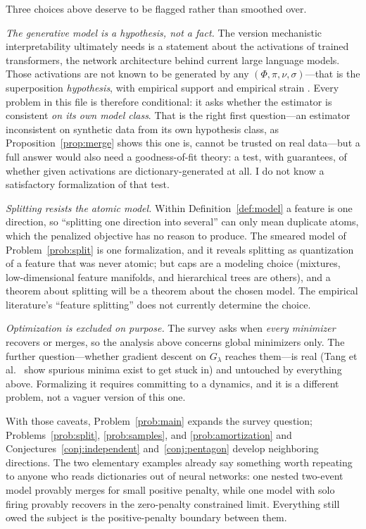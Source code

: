 \documentclass[11pt]{amsart}
\theoremstyle{plain}
\theoremstyle{definition}
\begin{document}
Three choices above deserve to be flagged rather than smoothed over.

\emph{The generative model is a hypothesis, not a fact.} The version mechanistic interpretability ultimately needs is a statement about the activations of trained transformers, the network architecture behind current large language models. Those activations are not known to be generated by any $(\Phi,\pi,\nu,\sigma)$---that is the superposition \emph{hypothesis}, with empirical support \cite{elhage2022,bricken2023} and empirical strain \cite{leask2025}. Every problem in this file is therefore conditional: it asks whether the estimator is consistent \emph{on its own model class}. That is the right first question---an estimator inconsistent on synthetic data from its own hypothesis class, as Proposition~\ref{prop:merge} shows this one is, cannot be trusted on real data---but a full answer would also need a goodness-of-fit theory: a test, with guarantees, of whether given activations are dictionary-generated at all. I do not know a satisfactory formalization of that test.

\emph{Splitting resists the atomic model.} Within Definition~\ref{def:model} a feature is one direction, so ``splitting one direction into several'' can only mean duplicate atoms, which the penalized objective has no reason to produce. The smeared model of Problem~\ref{prob:split} is one formalization, and it reveals splitting as quantization of a feature that was never atomic; but caps are a modeling choice (mixtures, low-dimensional feature manifolds, and hierarchical trees are others), and a theorem about splitting will be a theorem about the chosen model. The empirical literature's ``feature splitting'' \cite{chanin2024,leask2025} does not currently determine the choice.

\emph{Optimization is excluded on purpose.} The survey asks when \emph{every minimizer} recovers or merges, so the analysis above concerns global minimizers only. The further question---whether gradient descent on $G_\lambda$ reaches them---is real (Tang et al.~\cite{tang2025} show spurious minima exist to get stuck in) and untouched by everything above. Formalizing it requires committing to a dynamics, and it is a different problem, not a vaguer version of this one.

With those caveats, Problem~\ref{prob:main} expands the survey question; Problems~\ref{prob:split}, \ref{prob:samples}, and \ref{prob:amortization} and Conjectures~\ref{conj:independent} and~\ref{conj:pentagon} develop neighboring directions. The two elementary examples already say something worth repeating to anyone who reads dictionaries out of neural networks: one nested two-event model provably merges for small positive penalty, while one model with solo firing provably recovers in the zero-penalty constrained limit. Everything still owed the subject is the positive-penalty boundary between them.
\end{document}
